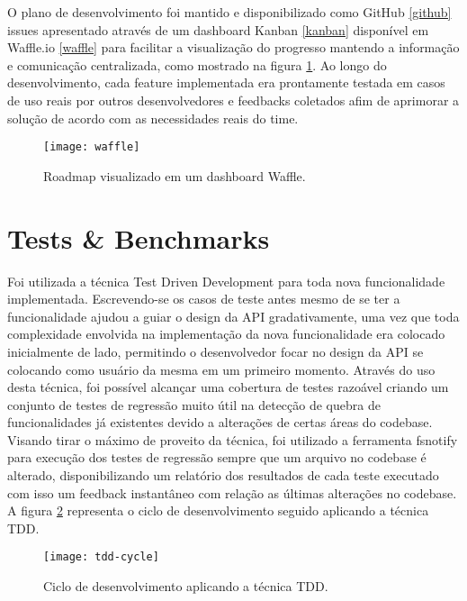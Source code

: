 O plano de desenvolvimento foi mantido e disponibilizado como GitHub \ref{github} issues apresentado através de um dashboard Kanban \ref{kanban} disponível em Waffle.io \ref{waffle} para facilitar a visualização do progresso mantendo a informação e comunicação centralizada, como mostrado na figura \ref{fig:waffle}. Ao longo do desenvolvimento, cada feature implementada era prontamente testada em casos de uso reais por outros desenvolvedores e feedbacks coletados afim de aprimorar a solução de acordo com as necessidades reais do time.

\begin{figure}[H]
  \texttt{[image: waffle]}
  \centering
  \caption{Roadmap visualizado em um dashboard Waffle.}
  \label{fig:waffle}
\end{figure}

\section{Tests \& Benchmarks}
\label{sec:tests_n_benchmarks}

Foi utilizada a técnica Test Driven Development \cite{book:tdd:kent_beck} para toda nova funcionalidade implementada. Escrevendo-se os casos de teste antes mesmo de se ter a funcionalidade ajudou a guiar o design da API gradativamente, uma vez que toda complexidade envolvida na implementação da nova funcionalidade era colocado inicialmente de lado, permitindo o desenvolvedor focar no design da API se colocando como usuário da mesma em um primeiro momento. Através do uso desta técnica, foi possível alcançar uma cobertura de testes razoável criando um conjunto de testes de regressão muito útil na detecção de quebra de funcionalidades já existentes devido a alterações de certas áreas do codebase. Visando tirar o máximo de proveito da técnica, foi utilizado a ferramenta fsnotify \cite{tools:fsnotify} para execução dos testes de regressão sempre que um arquivo no codebase é alterado, disponibilizando um relatório dos resultados de cada teste executado com isso um feedback instantâneo com relação as últimas alterações no codebase. A figura \ref{fig:tdd-cycle} representa o ciclo de desenvolvimento seguido aplicando a técnica TDD.

\begin{figure}[H]
  \texttt{[image: tdd-cycle]}
  \centering
  \caption{Ciclo de desenvolvimento aplicando a técnica TDD.}
  \label{fig:tdd-cycle}
\end{figure}

